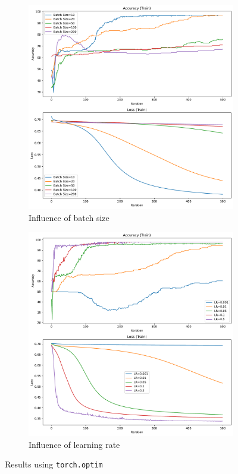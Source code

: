 \begin{figure}[H]\ContinuedFloat
    \centering
    \begin{subfigure}{0.45\textwidth}
        \centering
        \includegraphics[width=\textwidth]{figs/NN/torchoptim_batchsize.pdf}
        \caption{Influence of batch size}
        \label{subfig:torchoptim_batchsize}
    \end{subfigure}
    \begin{subfigure}{0.45\textwidth}
        \centering
        \includegraphics[width=\textwidth]{figs/NN/torchoptim_lr.pdf}
        \caption{Influence of learning rate}
        \label{subfig:torchoptim_lr}
    \end{subfigure}
    \caption{Results using \texttt{torch.optim}}
    \label{fig:torchoptim}
\end{figure}

